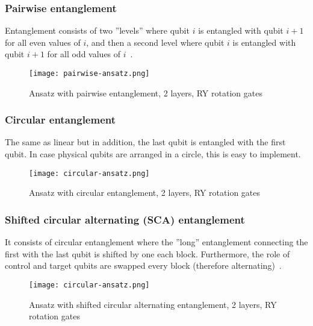 \subsubsection{Pairwise entanglement}
Entanglement consists of two ''levels'' where qubit $i$ is entangled with qubit $i+1$ for all even values of $i$, and then a second level where qubit $i$ is entangled with qubit $i+1$ for all odd values of $i$~\cite{twolocal}. 
\begin{figure}[H]
    \texttt{[image: pairwise-ansatz.png]}
    \caption{Ansatz with pairwise entanglement, 2 layers, RY rotation gates}
\end{figure}

\subsubsection{Circular entanglement}
The same as linear but in addition, the last qubit is entangled with the first qubit. In case physical qubits are arranged in a circle, this is easy to implement.
\begin{figure}[H]
    \texttt{[image: circular-ansatz.png]}
    \caption{Ansatz with circular entanglement, 2 layers, RY rotation gates}
\end{figure}

\subsubsection{Shifted circular alternating (SCA) entanglement}
It consists of circular entanglement where the ''long'' entanglement connecting the first with the last qubit is shifted by one each block. Furthermore, the role of control and target qubits are swapped every block (therefore alternating)~\cite{twolocal}.
\begin{figure}[H]
    \texttt{[image: circular-ansatz.png]}
    \caption{Ansatz with shifted circular alternating entanglement, 2 layers, RY rotation gates}
\end{figure}

\\